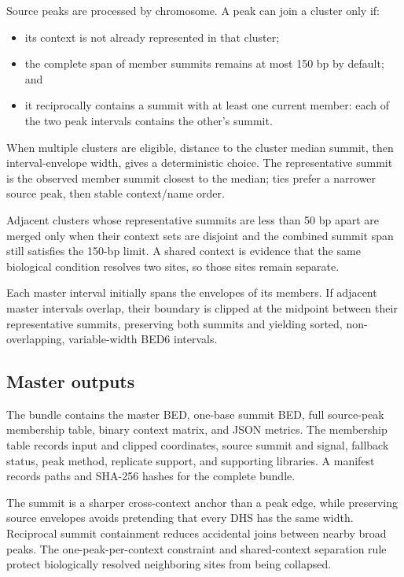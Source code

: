 \documentclass[11pt]{article}
\begin{document}
Source peaks are processed by chromosome.  A peak can join a cluster only if:

\begin{itemize}
  \item its context is not already represented in that cluster;
  \item the complete span of member summits remains at most 150 bp by default;
  and
  \item it reciprocally contains a summit with at least one current member:
  each of the two peak intervals contains the other's summit.
\end{itemize}

When multiple clusters are eligible, distance to the cluster median summit,
then interval-envelope width, gives a deterministic choice.  The representative
summit is the observed member summit closest to the median; ties prefer a
narrower source peak, then stable context/name order.

Adjacent clusters whose representative summits are less than 50 bp apart are
merged only when their context sets are disjoint and the combined summit span
still satisfies the 150-bp limit.  A shared context is evidence that the same
biological condition resolves two sites, so those sites remain separate.

Each master interval initially spans the envelopes of its members.  If adjacent
master intervals overlap, their boundary is clipped at the midpoint between
their representative summits, preserving both summits and yielding sorted,
non-overlapping, variable-width BED6 intervals.

\subsection{Master outputs}

The bundle contains the master BED, one-base summit BED, full source-peak
membership table, binary context matrix, and JSON metrics.  The membership
table records input and clipped coordinates, source summit and signal,
fallback status, peak method, replicate support, and supporting libraries.  A
manifest records paths and SHA-256 hashes for the complete bundle.

The summit is a sharper cross-context anchor than a peak edge, while preserving
source envelopes avoids pretending that every DHS has the same width.
Reciprocal summit containment reduces accidental joins between nearby broad
peaks.  The one-peak-per-context constraint and shared-context separation rule
protect biologically resolved neighboring sites from being collapsed.
\end{document}
